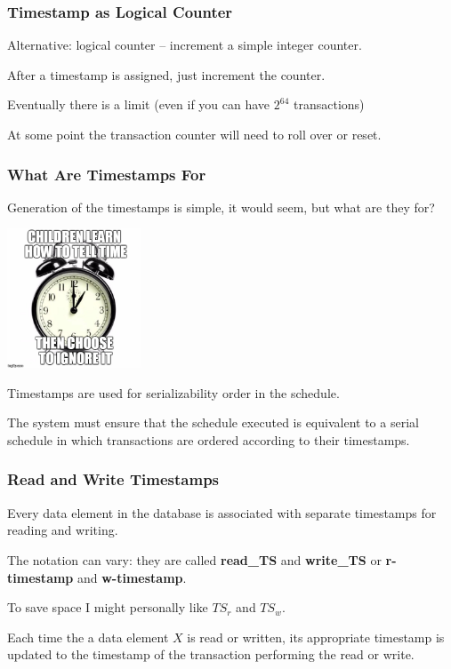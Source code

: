\begin{frame}
\frametitle{Timestamp as Logical Counter}

Alternative: logical counter -- increment a simple integer counter.

After a timestamp is assigned, just increment the counter. 

Eventually there is a limit (even if you can have $2^{64}$ transactions)

At some point the transaction counter will need to roll over or reset.

\end{frame}

\begin{frame}
\frametitle{What Are Timestamps For}

Generation of the timestamps is simple, it would seem, but what are they for? 

\begin{center}
	\includegraphics[width=0.3\textwidth]{images/telltime.jpg}
\end{center}

Timestamps are used for serializability order in the schedule. 

The system must ensure that the schedule executed is equivalent to a serial schedule in which transactions are ordered according to their timestamps.

\end{frame}

\begin{frame}
\frametitle{Read and Write Timestamps}

Every data element in the database is associated with separate timestamps for reading and writing. 

The notation can vary: they are called \textbf{read\_TS} and \textbf{write\_TS} or \textbf{r-timestamp} and \textbf{w-timestamp}. 

To save space I might personally like $T\!S_{r}$ and $T\!S_{w}$. 

Each time the a data element $X$ is read or written, its appropriate timestamp is updated to the timestamp of the transaction performing the read or write.

\end{frame}

